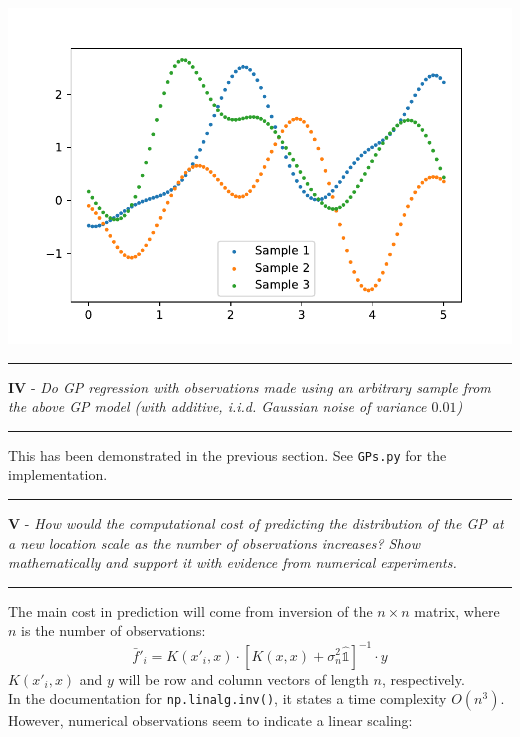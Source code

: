 \documentclass[12pt]{article}
\newcommand{\idop}{\hat{\mathds{1}}}
\begin{document}
    \begin{center}
        \includegraphics{sampling.pdf}
    \end{center}
    \begin{center}
        \hrule\vspace*{0.25cm}
        \textbf{IV} - \textit{Do GP regression with observations made using an arbitrary sample from the above GP model (with additive, i.i.d. Gaussian noise of variance $0.01$)}\vspace*{0.25cm}\hrule
    \end{center}
    This has been demonstrated in the previous section. See \verb|GPs.py| for the implementation.
    \begin{center}
        \hrule\vspace*{0.25cm}
        \textbf{V} - \textit{How would the computational cost of predicting the distribution of the GP at a new location scale as the number of observations increases? Show mathematically and support it with evidence from numerical experiments.}\vspace*{0.25cm}\hrule
    \end{center}
    The main cost in prediction will come from inversion of the $n\times n$ matrix, where $n$ is the number of observations:
    \begin{equation*}
        \bar f'_i = K(x'_i,x) \cdot \left[ K(x,x) + \sigma_n^2\idop\right]^{-1}\cdot y
    \end{equation*}
    $K(x'_i,x)$ and $y$ will be row and column vectors of length $n$, respectively.\\
    In the documentation for \verb|np.linalg.inv()|, it states a time complexity $O(n^3)$. However, numerical observations seem to indicate a linear scaling:
\end{document}
